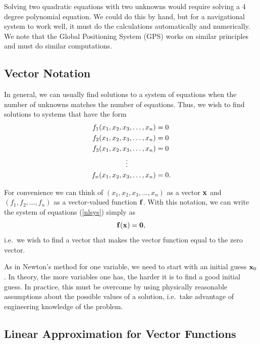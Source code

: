 Solving two quadratic equations with two unknowns would require
solving a 4 degree polynomial equation. We could do this by hand, but
for a navigational system to work well, it must do the calculations
automatically and numerically. We note that the Global Positioning
System (GPS) works on similar principles and must do similar
computations.


\subsection*{Vector Notation}

In general, we can usually find solutions to a system of equations
when the number of unknowns matches the number of equations.
Thus, we wish to find solutions to systems that have the form
\begin{equation}\label{nlsys}
\begin{split}
f_1(x_1, x_2, x_3, \ldots , x_n) & = 0 \\
f_2(x_1, x_2, x_3, \ldots , x_n) & = 0 \\
f_3(x_1, x_2, x_3, \ldots , x_n) & = 0 \\
      \vdots \hspace*{1.4cm}      &  \\
f_n(x_1, x_2, x_3, \ldots , x_n) & = 0. \\
\end{split}
\end{equation}

For convenience we can think of $(x_1, x_2, x_3, \ldots , x_n)$ as
a vector $\mathbf{x}$ and $(f_1, f_2, \ldots, f_n)$ as a vector-valued function
$\mathbf{f}$. With this notation, we can write the system of equations (\ref{nlsys})
simply as
$$
   \mathbf{f}(\mathbf{x}) = \mathbf{0},
$$
i.e.\ we wish to find a vector that makes the vector function equal to
the zero vector.

As in Newton's method for one variable, we need to start with an
initial guess $\mathbf{x}_0$. In theory, the more variables one has, the
harder it is to find a good initial guess. In practice, this must
be overcome by using physically reasonable assumptions about
the possible values of a solution, i.e.~take advantage of engineering
knowledge of the problem.


\subsection*{Linear Approximation for Vector Functions}

